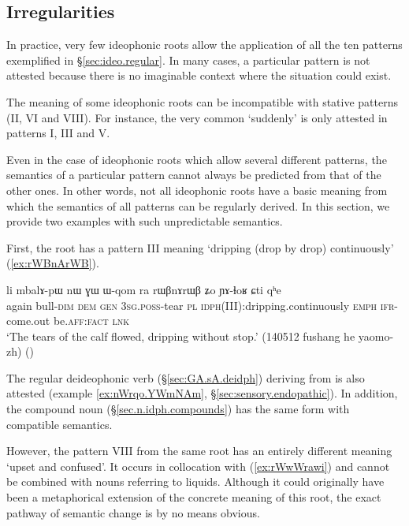 \subsection{Irregularities} \label{sec:ideo.irregular}
In practice, very few ideophonic roots allow the application of all the ten patterns exemplified in §\ref{sec:ideo.regular}.  In many cases, a particular pattern is not attested because there is no imaginable context where the situation could exist.

The meaning of some ideophonic roots can be incompatible with stative patterns (II, VI and VIII). For instance, the very common   `suddenly' is only attested in patterns I, III and V. 

Even in the case of ideophonic roots which allow several different patterns, the semantics of a particular pattern cannot always be predicted from that of the other ones. In other words, not all ideophonic roots have a basic meaning from which the semantics of all patterns can be regularly derived. In this section, we provide two examples with such unpredictable semantics.

First, the root    has a pattern III  meaning `dripping (drop by drop) continuously' (\ref{ex:rWBnArWB}).
  
\begin{exe} 
\ex  \label{ex:rWBnArWB}
\gll li mbalɤ-pɯ nɯ ɣɯ ɯ-qom ra rɯβnɤrɯβ ʑo ɲɤ-ɬoʁ ɕti qʰe \\
again bull-\textsc{dim} \textsc{dem} \textsc{gen} \textsc{3sg}.\textsc{poss}-tear \textsc{pl} \textsc{idph}(III):dripping.continuously  \textsc{emph} \textsc{ifr}-come.out be.\textsc{aff}:\textsc{fact} \textsc{lnk} \\
\glt `The tears of the calf flowed, dripping without stop.' (140512 fushang he yaomo-zh)
()
 \end{exe}

The regular  deideophonic verb (§\ref{sec:GA.sA.deidph})   deriving from  is also attested (example \ref{ex:nWrqo.YWmNAm}, §\ref{sec:sensory.endopathic}). In addition, the compound noun  (§\ref{sec.n.idph.compounds}) has the same form with compatible semantics.

However, the pattern VIII  from the same root has an entirely different meaning  `upset and confused'. It occurs in collocation with  (\ref{ex:rWwWrawi}) and cannot be combined with nouns referring to liquids.  Although it could originally have been a metaphorical extension of the concrete meaning of this root, the exact pathway of semantic change is by no means obvious.
 
